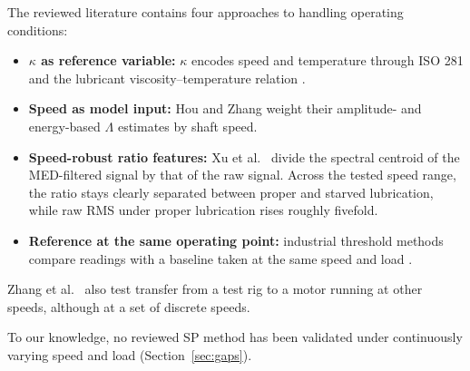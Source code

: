 The reviewed literature contains four approaches to handling operating conditions:
\begin{itemize}
    \item \textbf{$\kappa$ as reference variable:} $\kappa$ encodes speed and temperature through ISO 281 and the lubricant viscosity--temperature relation \cite{jakobsen_vibration_2021,jakobsen_detecting_2023}.
    \item \textbf{Speed as model input:} Hou and Zhang \cite{hou_-situ_2025} weight their amplitude- and energy-based $\Lambda$ estimates by shaft speed.
    \item \textbf{Speed-robust ratio features:} Xu et al.\ \cite{xu_vibration-based_2024} divide the spectral centroid of the MED-filtered signal by that of the raw signal. Across the tested speed range, the ratio stays clearly separated between proper and starved lubrication, while raw RMS under proper lubrication rises roughly fivefold.
    \item \textbf{Reference at the same operating point:} industrial threshold methods compare readings with a baseline taken at the same speed and load \cite{lineham_ultrasonic_2008}.
\end{itemize}
Zhang et al.\ \cite{zhang_interpretable_2026} also test transfer from a test rig to a motor running at other speeds, although at a set of discrete speeds.

To our knowledge, no reviewed SP method has been validated under continuously varying speed and load (Section~\ref{sec:gaps}).



